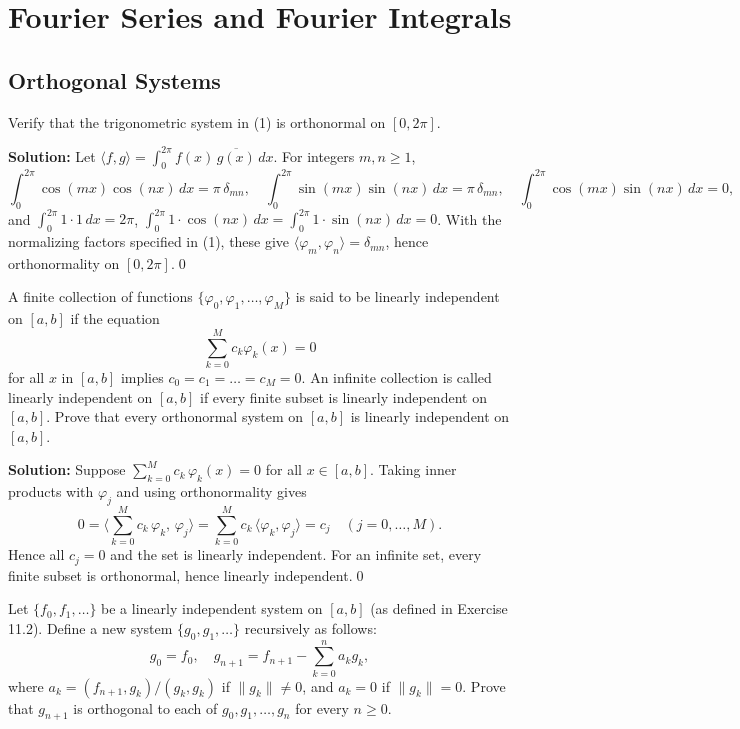 \chapter{Fourier Series and Fourier Integrals}

\section{Orthogonal Systems}



\begin{problembox}
Verify that the trigonometric system in (1) is orthonormal on $[0, 2\pi]$.
\end{problembox}

\noindent\textbf{Solution:}
Let $\langle f, g\rangle = \int_0^{2\pi} f(x)\,\overline{g(x)}\,dx$. For integers $m, n \ge 1$,
\[
\int_0^{2\pi} \cos(mx)\cos(nx)\,dx = \pi\,\delta_{mn},\quad \int_0^{2\pi} \sin(mx)\sin(nx)\,dx = \pi\,\delta_{mn},\quad \int_0^{2\pi} \cos(mx)\sin(nx)\,dx = 0,
\]
and $\int_0^{2\pi} 1\cdot 1\,dx = 2\pi$, $\int_0^{2\pi} 1\cdot \cos(nx)\,dx = \int_0^{2\pi} 1\cdot \sin(nx)\,dx = 0$. With the normalizing factors specified in (1), these give $\langle \varphi_m, \varphi_n\rangle = \delta_{mn}$, hence orthonormality on $[0,2\pi]$.\qed


\begin{problembox}
A finite collection of functions $\{\varphi_0, \varphi_1, \dots, \varphi_M\}$ is said to be linearly independent on $[a, b]$ if the equation
\[
\sum_{k=0}^M c_k \varphi_k(x) = 0
\]
for all $x$ in $[a, b]$ implies $c_0 = c_1 = \dots = c_M = 0$. An infinite collection is called linearly independent on $[a, b]$ if every finite subset is linearly independent on $[a, b]$. Prove that every orthonormal system on $[a, b]$ is linearly independent on $[a, b]$.
\end{problembox}

\noindent\textbf{Solution:}
Suppose $\sum_{k=0}^M c_k\,\varphi_k(x)=0$ for all $x\in[a,b]$. Taking inner products with $\varphi_j$ and using orthonormality gives
\[
0 = \Big\langle \sum_{k=0}^M c_k\,\varphi_k,\,\varphi_j\Big\rangle = \sum_{k=0}^M c_k\,\langle\varphi_k,\varphi_j\rangle = c_j\quad (j=0,\dots,M).
\]
Hence all $c_j=0$ and the set is linearly independent. For an infinite set, every finite subset is orthonormal, hence linearly independent.\qed


\begin{problembox}
Let $\{f_0, f_1, \dots\}$ be a linearly independent system on $[a, b]$ (as defined in Exercise 11.2). Define a new system $\{g_0, g_1, \dots\}$ recursively as follows:
\[
g_0 = f_0, \quad g_{n+1} = f_{n+1} - \sum_{k=0}^n a_k g_k,
\]
where $a_k = (f_{n+1}, g_k)/(g_k, g_k)$ if $\|g_k\| \neq 0$, and $a_k = 0$ if $\|g_k\| = 0$. Prove that $g_{n+1}$ is orthogonal to each of $g_0, g_1, \dots, g_n$ for every $n \geq 0$.
\end{problembox}

